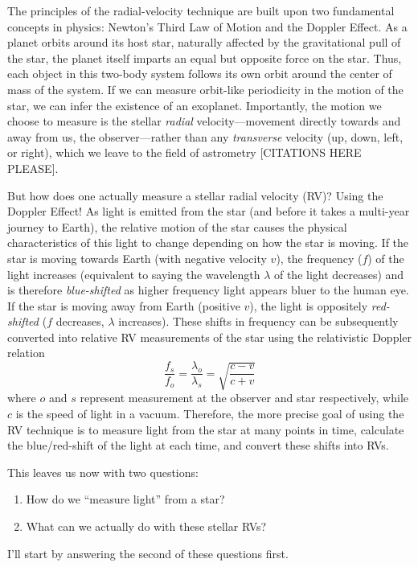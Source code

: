The principles of the radial-velocity technique are built upon two fundamental concepts in physics: Newton's Third Law of Motion and the Doppler Effect. As a planet orbits around its host star, naturally affected by the gravitational pull of the star, the planet itself imparts an equal but opposite force on the star. Thus, each object in this two-body system follows its own orbit around the center of mass of the system. If we can measure orbit-like periodicity in the motion of the star, we can infer the existence of an exoplanet. Importantly, the motion we choose to measure is the stellar \textit{radial} velocity---movement directly towards and away from us, the observer---rather than any \textit{transverse} velocity (up, down, left, or right), which we leave to the field of astrometry \citep[e.g.][]{} [CITATIONS HERE PLEASE].

But how does one actually measure a stellar radial velocity (RV)? Using the Doppler Effect! As light is emitted from the star (and before it takes a multi-year journey to Earth), the relative motion of the star causes the physical characteristics of this light to change depending on how the star is moving. If the star is moving towards Earth (with negative velocity $v$), the frequency ($f$) of the light increases (equivalent to saying the wavelength $\lambda$ of the light decreases) and is therefore \textit{blue-shifted} as higher frequency light appears bluer to the human eye. If the star is moving away from Earth (positive $v$), the light is oppositely \textit{red-shifted} ($f$ decreases, $\lambda$ increases). These shifts in frequency can be subsequently converted into relative RV measurements of the star using the relativistic Doppler relation
\begin{equation}
    \frac{f_s}{f_o} = \frac{\lambda_o}{\lambda_s} = \sqrt{\frac{c - v}{c + v}}
\end{equation}
where $o$ and $s$ represent measurement at the observer and star respectively, while $c$ is the speed of light in a vacuum. Therefore, the more precise goal of using the RV technique is to measure light from the star at many points in time, calculate the blue/red-shift of the light at each time, and convert these shifts into RVs.

This leaves us now with two questions:
\begin{enumerate}
    \item How do we ``measure light'' from a star?
    \item What can we actually do with these stellar RVs?
\end{enumerate} I'll start by answering the second of these questions first.

